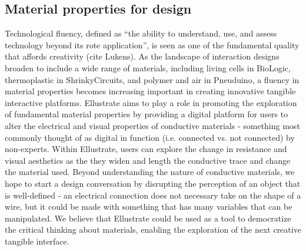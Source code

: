 \documentclass{sigchi}
\begin{document}
\subsection{Material properties for design}

Technological fluency, defined as ``the ability to understand, use, and assess technology beyond its rote application'', is seen as one of the fundamental quality that affords creativity (cite Lukens). As the landscape of interaction designs broaden to include a wide range of materials, including living cells in BioLogic, thermoplastic in ShrinkyCircuits, and polymer and air in Pneuduino, a fluency in material properties becomes increasing important in creating innovative tangible interactive platforms. Ellustrate aims to play a role in promoting the exploration of fundamental material properties by providing a digital platform for users to alter the electrical and visual properties of conductive materials - something most commonly thought of as digital in function (i.e. connected vs. not connected) by non-experts. Within Ellustrate, users can explore the change in resistance and visual aesthetics as the they widen and length the conductive trace and change the material used. Beyond understanding the nature of conductive materials, we hope to start a design conversation by disrupting the perception of an object that is well-defined - an electrical connection does not necessary take on the shape of a wire, but it could be made with something that has many variables that can be manipulated. We believe that Ellustrate could be used as a tool to democratize the critical thinking about materials, enabling the exploration of the next creative tangible interface. 


\end{document}
